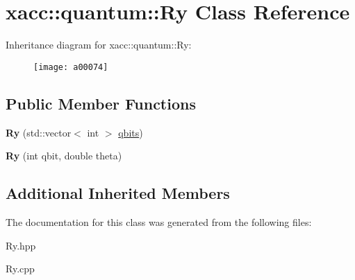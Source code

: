 \hypertarget{a00074}{}\section{xacc\+:\+:quantum\+:\+:Ry Class Reference}
\label{a00074}
Inheritance diagram for xacc\+:\+:quantum\+:\+:Ry\+:\begin{figure}[H]
\begin{center}
\leavevmode
\texttt{[image: a00074]}
\end{center}
\end{figure}
\subsection*{Public Member Functions}
\begin{DoxyCompactItemize}
\item 
{\bfseries Ry} (std\+::vector$<$ int $>$ \hyperlink{a00041_a2a56be6c2519ea65df4d06f4abae1393}{qbits})\hypertarget{a00074_a542e1c0576a8e784f6cece4c77598486}{}\label{a00074_a542e1c0576a8e784f6cece4c77598486}

\item 
{\bfseries Ry} (int qbit, double theta)\hypertarget{a00074_a1cb81fe622168ba8d79fa2a78b5b0006}{}\label{a00074_a1cb81fe622168ba8d79fa2a78b5b0006}

\end{DoxyCompactItemize}
\subsection*{Additional Inherited Members}


The documentation for this class was generated from the following files\+:\begin{DoxyCompactItemize}
\item 
Ry.\+hpp\item 
Ry.\+cpp\end{DoxyCompactItemize}
